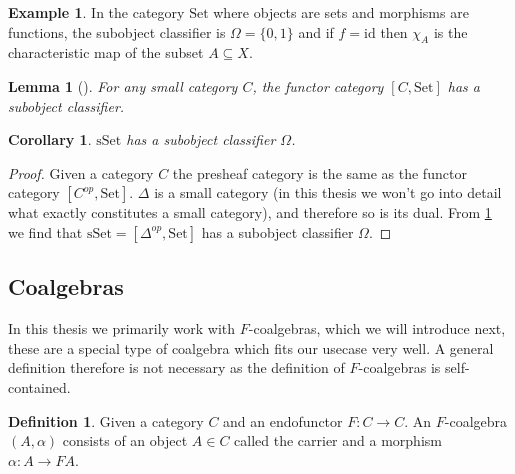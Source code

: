 \documentclass[12pt]{article}
\newtheorem{lemma}[theorem]{Lemma}
\newtheorem{corollary}[theorem]{Corollary}
\theoremstyle{definition}
\newtheorem{definition}[theorem]{Definition}
\newtheorem{example}[theorem]{Example}
\newcommand{\1}{\mathbbm{1}}
\newcommand{\id}{\text{id}}
\begin{document}
\begin{example}
    In the category $\mathrm{Set}$ where objects are sets and morphisms are functions, the subobject classifier is $\Omega = \{0,1\}$ and if $f = \id$ then $\chi_A$ is the characteristic map of the subset $A\subseteq X$.
\end{example}

\begin{lemma}[{\cite[Lemma.~1.6.5]{Elephant}}]\label{lem:exist-sub_class}
    For any small category $C$, the functor category $[C, \mathrm{Set}]$ has a subobject classifier.
\end{lemma}

\begin{corollary}
    $\mathrm{sSet}$ has a subobject classifier $\Omega$.
\end{corollary}

\begin{proof}
    Given a category $C$ the presheaf category is the same as the functor category $[C^{op}, \mathrm{Set}]$. $\Delta$ is a small category (in this thesis we won't go into detail what exactly constitutes a small category), and therefore so is its dual. From \ref{lem:exist-sub_class} we find that $\mathrm{sSet} = [\Delta^{op}, \mathrm{Set}]$ has a subobject classifier $\Omega$.
\end{proof}

\subsection{Coalgebras}
In this thesis we primarily work with $F$-coalgebras, which we will introduce next, these are a special type of coalgebra which fits our usecase very well. A general definition therefore is not necessary as the definition of $F$-coalgebras is self-contained.

\begin{definition}
    Given a category $C$ and an endofunctor $F: C \to C$. An $F$-coalgebra $(A,\alpha)$ consists of an object $A\in C$ called the carrier and a morphism $\alpha: A\to FA$.
\end{definition}
\end{document}
